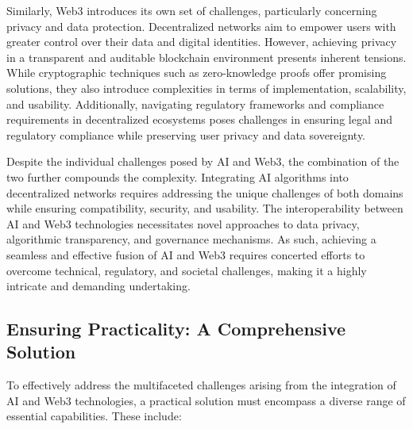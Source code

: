 \documentclass[conference]{IEEEtran}
\begin{document}
Similarly, Web3 introduces its own set of challenges, particularly concerning privacy and data protection. Decentralized networks aim to empower users with greater control over their data and digital identities. However, achieving privacy in a transparent and auditable blockchain environment presents inherent tensions. While cryptographic techniques such as zero-knowledge proofs offer promising solutions, they also introduce complexities in terms of implementation, scalability, and usability. Additionally, navigating regulatory frameworks and compliance requirements in decentralized ecosystems poses challenges in ensuring legal and regulatory compliance while preserving user privacy and data sovereignty.

Despite the individual challenges posed by AI and Web3, the combination of the two further compounds the complexity. Integrating AI algorithms into decentralized networks requires addressing the unique challenges of both domains while ensuring compatibility, security, and usability. The interoperability between AI and Web3 technologies necessitates novel approaches to data privacy, algorithmic transparency, and governance mechanisms. As such, achieving a seamless and effective fusion of AI and Web3 requires concerted efforts to overcome technical, regulatory, and societal challenges, making it a highly intricate and demanding undertaking.

\subsection{Ensuring Practicality: A Comprehensive Solution}

To effectively address the multifaceted challenges arising from the integration of AI and Web3 technologies, a practical solution must encompass a diverse range of essential capabilities. These include:
\end{document}
